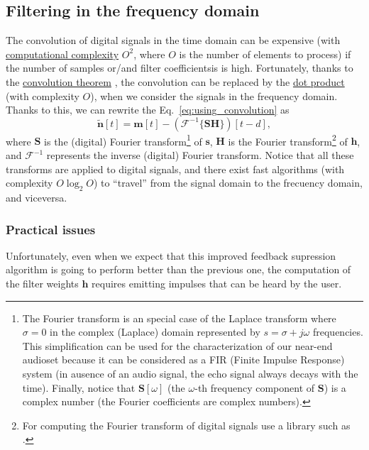 \subsection{Filtering in the frequency domain}
The convolution of digital signals in the time domain can be expensive
(with
\href{https://en.wikipedia.org/wiki/Computational_complexity_theory}{computational
  complexity} $O^2$, where $O$ is the number of elements to process)
if the number of samples or/and filter coefficientsis is
high. Fortunately, thanks to the
\href{https://en.wikipedia.org/wiki/Convolution}{convolution theorem}
\cite{kovacevic2013fourier,Oppenheim2}, the convolution can be
replaced by the \href{https://en.wikipedia.org/wiki/Dot_product}{dot
  product} (with complexity $O$), when we consider the signals in the
frequency domain. Thanks to this, we can rewrite the
Eq.~\eqref{eq:using_convolution} as
\begin{equation}
  \tilde{\mathbf n}[t] = {\mathbf m}[t] - ({\mathcal F}^{-1}\{{\mathbf S}{\mathbf H}\})[t-d],
  \label{eq:faster}
\end{equation}
where ${\mathbf S}$ is the (digital) Fourier transform\footnote{The
Fourier transform is an special case of the Laplace transform where
$\sigma=0$ in the complex (Laplace) domain represented by
$s=\sigma+j\omega$ frequencies. This simplification can be used for
the characterization of our near-end audioset because it can be
considered as a FIR (Finite Impulse Response) system (in ausence of an
audio signal, the echo signal always decays with the time). Finally,
notice that ${\mathbf S}[\omega]$ (the $\omega$-th frequency component
of ${\mathbf S}$) is a complex number (the Fourier coefficients are
complex numbers).} of ${\mathbf s}$, ${\mathbf H}$ is the Fourier
transform\footnote{For computing the Fourier transform of digital
signals use a library such as
\href{https://numpy.org/doc/2.1/reference/routines.fft.html}{}.}
of ${\mathbf h}$, and ${\mathcal F}^{-1}$ represents the inverse
(digital) Fourier transform. Notice that all these transforms are
applied to digital signals, and there exist fast algorithms (with
complexity $O\log_2O$) to ``travel'' from the signal domain to the
frecuency domain, and viceversa.

\subsubsection*{Practical issues}
Unfortunately, even when we expect that this improved feedback
supression algorithm is going to perform better than the previous one,
the computation of the filter weights ${\mathbf h}$ requires emitting
impulses that can be heard by the user.

